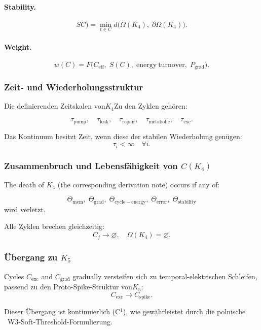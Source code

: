 \paragraph{Stability.}
\[
SC)
   = \min_{t\in C}
       d\bigl(
         \Omega(K_4),\;
         \partial\Omega(K_4)
       \bigr).
\]

\paragraph{Weight.}
\[
  w(C)=F\bigl(
        C_{\mathrm{eff}},\;
        S(C),\;
        \mathrm{energy\ turnover},\;
        P_{\mathrm{grad}}
      \bigr).
\]

\subsubsection{Zeit- und Wiederholungsstruktur}

Die definierenden Zeitskalen von$K_4$Zu den Zyklen gehören:

\[
  \tau_{\mathrm{pump}},\quad
  \tau_{\mathrm{leak}},\quad
  \tau_{\mathrm{repair}},\quad
  \tau_{\mathrm{metabolic}},\quad
  \tau_{\mathrm{exc}}.
\]

Das Kontinuum besitzt Zeit, wenn diese der stabilen Wiederholung genügen:
\[
  \tau_i<\infty \quad\forall i.
\]

\subsubsection{Zusammenbruch und Lebensfähigkeit von \texorpdfstring{$C(K_4)$}{C(K_4)}}

The death of $K_4$ (the corresponding derivation note) occurs if any of:

\[
  \Theta_{\mathrm{mem}},\;
  \Theta_{\mathrm{grad}},\;
  \Theta_{\mathrm{cycle-energy}},\;
  \Theta_{\mathrm{error}},\;
  \Theta_{\mathrm{stability}}
\]
wird verletzt.

Alle Zyklen brechen gleichzeitig:
\[
  C_j \to \varnothing,
\quad
  \Omega(K_4)=\varnothing.
\]

\subsubsection{Übergang zu \texorpdfstring{$K_5$}{K_5}}

Cycles $C_{\mathrm{exc}}$ and $C_{\mathrm{grad}}$ gradually
versteifen sich zu temporal-elektrischen Schleifen, passend zu den
Proto-Spike-Struktur von$K_5$:
\[
  C_{\mathrm{exc}}\longrightarrow C_{\mathrm{spike}}.
\]

Dieser Übergang ist kontinuierlich (C$^1$), wie gewährleistet durch
die polnische ~W3-Soft-Threshold-Formulierung.
